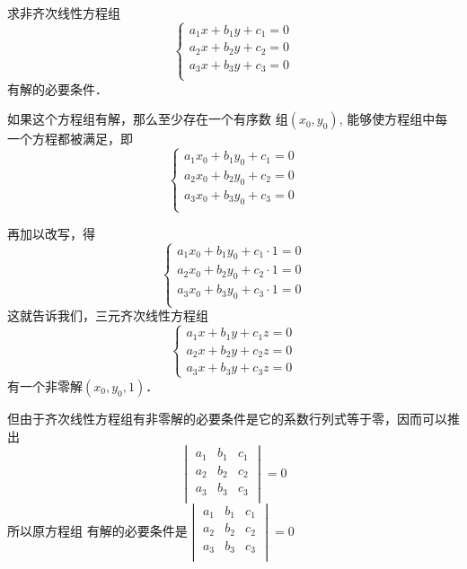 \begin{example}
    求非齐次线性方程组
    \[\begin{cases}
      a_1x+b_1y+c_1=0\\  
      a_2x+b_2y+c_2=0\\  
      a_3x+b_3y+c_3=0\\  
    \end{cases}\]
    有解的必要条件．
\end{example}

\begin{solution}
    如果这个方程组有解，那么至少存在一个有序数
    组$(x_0,y_0)$, 能够使方程组中每一个方程都被满足，即  
    \[\begin{cases}
        a_1x_0+b_1y_0+c_1=0\\  
        a_2x_0+b_2y_0+c_2=0\\  
        a_3x_0+b_3y_0+c_3=0\\  
      \end{cases}\]
    
      再加以改写，得
      \[\begin{cases}
        a_1x_0+b_1y_0+c_1\cdot 1=0\\  
        a_2x_0+b_2y_0+c_2\cdot 1=0\\  
        a_3x_0+b_3y_0+c_3\cdot 1=0\\  
      \end{cases}\]
      这就告诉我们，三元齐次线性方程组
      \[\begin{cases}
        a_1x+b_1y+c_1z=0\\
        a_2x+b_2y+c_2z=0\\
        a_3x+b_3y+c_3z=0
      \end{cases}\]
      有一个非零解$(x_0,y_0,1)$．

      但由于齐次线性方程组有非零解的必要条件是它的系数行列式等于零，因而可以推出
      \[\begin{vmatrix}
          a_1&b_1&c_1\\  a_2&b_2&c_2\\  a_3&b_3&c_3\\
      \end{vmatrix}=0\]
      所以原方程组
      有解的必要条件是$\begin{vmatrix}
        a_1&b_1&c_1\\  a_2&b_2&c_2\\  a_3&b_3&c_3\\
    \end{vmatrix}=0$
\end{solution}


